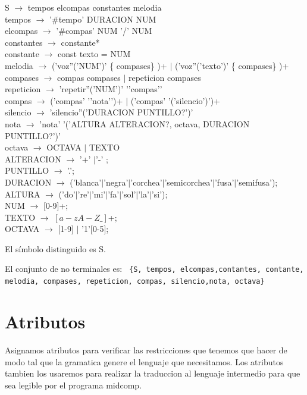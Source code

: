 \documentclass[a4paper]{article}
\begin{document}
S $\rightarrow$ tempos elcompas constantes melodia \\
tempos $\rightarrow$ '\#tempo' DURACION NUM \\
elcompas $\rightarrow$  '\#compas' NUM '/' NUM \\
constantes $\rightarrow$  constante* \\
constante $\rightarrow$  const texto = NUM \\
melodia $\rightarrow$  ('voz''('NUM')' \{ compases\} )+ $|$ ('voz''('texto')' \{ compases\} )+ \\
compases $\rightarrow$ compas compases $|$ repeticion compases \\
repeticion $\rightarrow$ 'repetir''('NUM')' '{'compas'}' \\
compas $\rightarrow$ ('compas' '{'nota'}')+ $|$ ('compas' '('silencio')')+ \\
silencio $\rightarrow$ 'silencio''('DURACION PUNTILLO?')' \\
nota $\rightarrow$ 'nota' '('ALTURA ALTERACION?, octava, DURACION PUNTILLO?')' \\
octava $\rightarrow$ OCTAVA $|$ TEXTO \\
ALTERACION $\rightarrow$ '+' $|$'-' ; \\
PUNTILLO $\rightarrow$ '.'; \\
DURACION $\rightarrow$ ('blanca'$|$'negra'$|$'corchea'$|$'semicorchea'$|$'fusa'$|$'semifusa'); \\
ALTURA $\rightarrow$ ('do'$|$'re'$|$'mi'$|$'fa'$|$'sol'$|$'la'$|$'si'); \\
NUM $\rightarrow$ [0-9]+; \\
TEXTO $\rightarrow$ $[a-zA-Z\_]$+; \\
OCTAVA $\rightarrow$ [1-9] $|$ '1'[0-5]; \linebreak



El símbolo distinguido es S.\linebreak


El conjunto de no terminales es:\linebreak
\texttt{
\{S, tempos, elcompas,contantes, contante, melodia, compases, repeticion, compas, silencio,nota, octava\}  \\
} 

\section{Atributos}

Asignamos atributos para verificar las restricciones que tenemos que hacer de modo tal que la gramatica genere el lenguaje que necesitamos.
Los atributos tambien los usaremos para realizar la traduccion al lenguaje intermedio para que sea legible por el programa midcomp.
\end{document}

